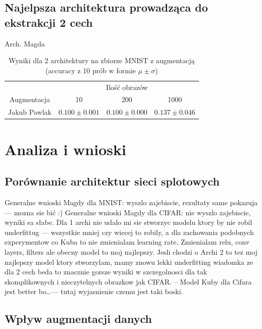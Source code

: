 \documentclass[10pt]{article}
\begin{document}
\subsection*{Najelpsza architektura prowadząca do ekstrakcji 2 cech}

Arch. Magda

\begin{table}[H]\centering
    \begin{tabular}{cccc}
        \toprule
                     & \multicolumn{3}{c}{Ilość obrazów}                                          \\ \cmidrule{2-4}
        Augmentacja  & 10                                & 200                & 1000              \\ \midrule
        Jakub Pawlak & $0.100 \pm 0.001 $                & $0.100 \pm 0.000 $ & $0.137 \pm 0.046$ \\
        \bottomrule
    \end{tabular}
    \caption{Wyniki dla 2 architektury na zbiorze MNIST z augmentacją (accuracy z 10 prób w formie $\mu \pm \sigma$)}
\end{table}

\pagebreak
\section{Analiza i wnioski}\label{sec:wyniki}
\subsection*{Porównanie architektur sieci splotowych}
Generalne wnioski Magdy dla MNIST\@: wyszlo zajebiscie, rezultaty same pokazuja --- mozna sie bić :)
Generalne wnioski Magdy dla CIFAR\@: nie wyszlo zajebiscie, wyniki sa słabe. Dla 1 archi nie udalo mi sie stworzyc modelu ktory by nie robil underfittug --- wszystkie mniej czy wiecej to robily, a dla zachowania podobnych experymentow co Kuba to nie zmienialam learning rate. Zmienialam relu, conv layers, filters ale obecny model to moj najlepszy.
Jesli chodzi o Archi 2 to tez moj najlepszy model ktory stworzylam, mamy znowu lekki underfitting
wiadomka ze dla 2 cech beda to znacznie gorsze wyniki w szczegolnosci dla tak skomplikownych i nieczytelnych obrazkow jak CIFAR\@.
--
Model Kuby dla Cifara jest better bo\ldots --- tutaj wyjasnienie czemu jest taki boski.
\subsection*{Wpływ augmentacji danych}
\end{document}
